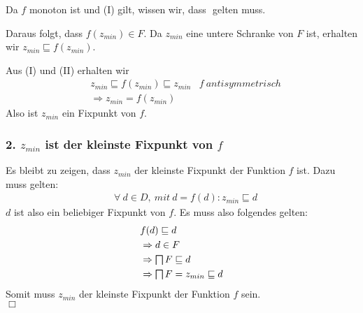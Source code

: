 Da $f$ monoton ist und (I) gilt, wissen wir, dass $ $ gelten muss.

Daraus folgt, dass $f(z_{min}) \in F$. Da $z_{min}$ eine untere Schranke von $F$ ist, erhalten wir $z_{min} \sqsubseteq f(z_{min})$.

Aus (I) und (II) erhalten wir
\begin{align*}
& z_{min} \sqsubseteq f(z_{min}) \sqsubseteq z_{min} & f  \medspace antisymmetrisch \\
& \Rightarrow z_{min} = f(z_{min}) &
\end{align*}
Also ist $z_{min}$ ein Fixpunkt von $f$.


\subsubsection*{2. $z_{min}$ ist der kleinste Fixpunkt von $f$ }
Es bleibt zu zeigen, dass $z_{min} $ der kleinste Fixpunkt der Funktion $f$ ist. Dazu muss gelten: \\
\begin{align*}
&\forall  \medspace d \in D,  \medspace mit  \medspace d = f(d): z_{min} \sqsubseteq d
\end{align*}
$d$ ist also ein beliebiger Fixpunkt von $f$. Es muss also folgendes gelten:
\begin{align*}
& f(d) \sqsubseteq d \\
& \Rightarrow d \in F \\
& \Rightarrow \Inf F \sqsubseteq d \\
& \Rightarrow \Inf F = z_{min} \sqsubseteq d
\end{align*}
Somit muss $z_{min}$ der kleinste Fixpunkt der Funktion $f$ sein. \\
$\Box$
